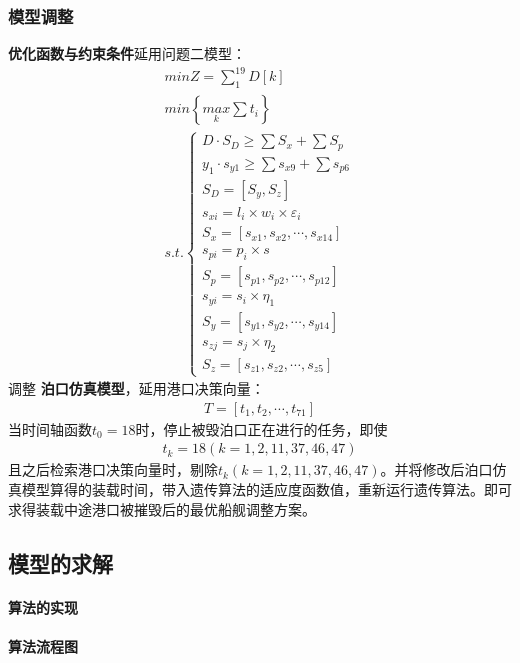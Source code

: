 \documentclass{whutmod}
\begin{document}
    \subsubsection{模型调整}
    \textbf{优化函数与约束条件}延用问题二模型：
     	\begin{gather}
     min Z=\sum _{1}^{19}D[k]\\
     min \left \{ \underset{k}{max}\sum t_{i} \right \}\\
     s.t.\left\{\begin{matrix}	 D\cdot S_{D}\geq \sum  S_{x} + \sum  S_{p}
     \\ y_{1}\cdot s_{y1}\geq \sum s_{x9}+ \sum  s_{p6}
     \\S_{D}=[S_{y}, S_{z}]
     \\ s_{xi}=l_{i}\times w_{i} \times \varepsilon _{i}
     \\S_{x}=[s_{x1},s_{x2},\cdots,s_{x14}]
     \\s_{pi}=p_{i}\times s
     \\S_{p}=[s_{p1},s_{p2},\cdots,s_{p12}]
     \\     s_{yi}=s_{i}\times \eta_{1}
     \\   S_{y}=[s_{y1},s_{y2},\cdots,s_{y14}]
     \\      s_{zj}=s_{j}\times \eta_{2}
     \\ S_{z}=[s_{z1},s_{z2},\cdots,s_{z5}]
     \end{matrix}\right. 
     \end{gather}
     调整 \textbf{泊口仿真模型}，延用港口决策向量：
     \begin{gather*}
     T=[t_{1},t_{2},\cdots,t_{71}]
     \end{gather*}
     当时间轴函数$t_{0}=18$时，停止被毁泊口正在进行的任务，即使
     \begin{gather}
     t_{k}=18(k=1,2,11,37,46,47)
     \end{gather}
     且之后检索港口决策向量时，剔除$ t_{k}(k=1,2,11,37,46,47)$。并将修改后泊口仿真模型算得的装载时间，带入遗传算法的适应度函数值，重新运行遗传算法。即可求得装载中途港口被摧毁后的最优船舰调整方案。
       \subsection{模型的求解}
     \paragraph{算法的实现}
     \paragraph{算法流程图}
\end{document}
